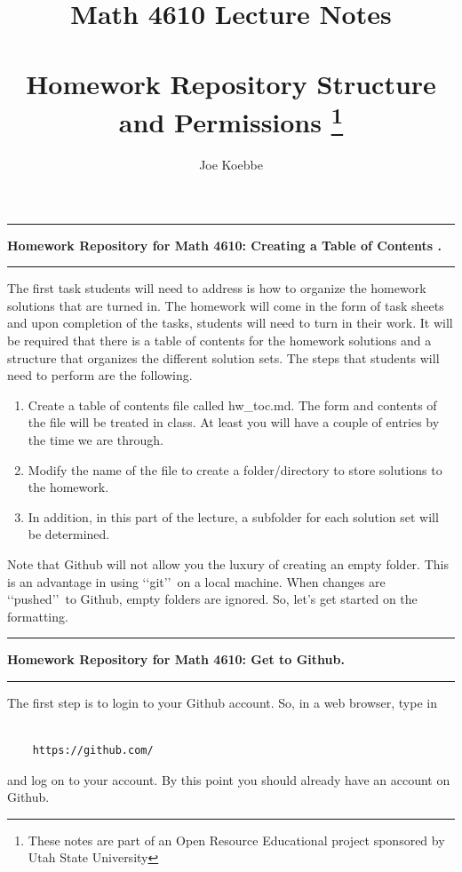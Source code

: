 \documentclass[10pt,fleqn]{article}
\title{Math 4610 Lecture Notes \\
            \ \\
       Homework Repository Structure and Permissions 
  \footnote{These notes are part of an Open Resource Educational project
            sponsored by Utah State University}}
\author{Joe Koebbe}
\begin{document}
\maketitle
\newpage
\vskip0.1in\hrule\vskip0.1in
\noindent
{\bf Homework Repository for Math 4610: Creating a Table of Contents .} 
\vskip0.1in\hrule\vskip0.1in
\noindent
The first task students will need to address is how to organize the homework
solutions that are turned in. The homework will come in the form of task sheets
and upon completion of the tasks, students will need to turn in their work. It
will be required that there is a table of contents for the homework solutions
and a structure that organizes the different solution sets. The steps that
students will need to perform are the following.
\begin{enumerate}
  \item Create a table of contents file called hw\_toc.md. The form and contents
        of the file will be treated in class. At least you will have a couple of
        entries by the time we are through.
  \item Modify the name of the file to create a folder/directory to store
        solutions to the homework.
  \item In addition, in this part of the lecture, a subfolder for each solution
        set will be determined.
\end{enumerate}
Note that Github will not allow you the luxury of creating an empty folder. This
is an advantage in using \lq\lq git\rq\rq\ on a local machine. When changes are
\lq\lq pushed\rq\rq\ to Github, empty folders are ignored. So, let's get started
on the formatting.
\newpage
\vskip0.1in\hrule\vskip0.1in
\noindent
{\bf Homework Repository for Math 4610: Get to Github.} 
\vskip0.1in\hrule\vskip0.1in
The first step is to login to your Github account. So, in a web browser, type in
\begin{verbatim}

    https://github.com/

\end{verbatim}
and log on to your account. By this point you should already have an account on
Github.
\vfill
\end{document}

